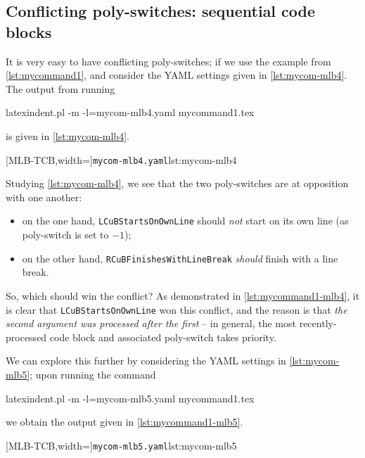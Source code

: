 \subsection{Conflicting poly-switches: sequential code blocks}
	It is very easy to have conflicting poly-switches; if we use the example from \vref{lst:mycommand1}, and consider the YAML settings given in \cref{lst:mycom-mlb4}.
	The output from running \begin{commandshell}
latexindent.pl -m -l=mycom-mlb4.yaml mycommand1.tex
\end{commandshell} is given in \cref{lst:mycom-mlb4}.

	\begin{minipage}{.4\linewidth}
	\end{minipage}
	\hfill
	\begin{minipage}{.55\linewidth}
		[MLB-TCB,width=\linewidth]{\texttt{mycom-mlb4.yaml}}{lst:mycom-mlb4}
	\end{minipage}

	Studying \cref{lst:mycom-mlb4}, we see that the two poly-switches are at opposition with one another: \begin{itemize} \item on the one hand, \texttt{LCuBStartsOnOwnLine} should \emph{not} start on its own line (as poly-switch is set to $-1$);
		\item on the other hand, \texttt{RCuBFinishesWithLineBreak} \emph{should} finish with a line break.
	\end{itemize}
	So, which should win the conflict?
	As demonstrated in \cref{lst:mycommand1-mlb4}, it is clear that \texttt{LCuBStartsOnOwnLine} won this conflict, and the reason is that \emph{the second argument was processed after the first} -- in general, the most recently-processed code block and associated poly-switch takes priority.

	We can explore this further by considering the YAML settings in \cref{lst:mycom-mlb5}; upon running the command \begin{commandshell}
latexindent.pl -m -l=mycom-mlb5.yaml mycommand1.tex
\end{commandshell} we obtain the output given in \cref{lst:mycommand1-mlb5}.

	\begin{minipage}{.4\linewidth}
	\end{minipage}
	\hfill
	\begin{minipage}{.55\linewidth}
		[MLB-TCB,width=\linewidth]{\texttt{mycom-mlb5.yaml}}{lst:mycom-mlb5}
	\end{minipage}

